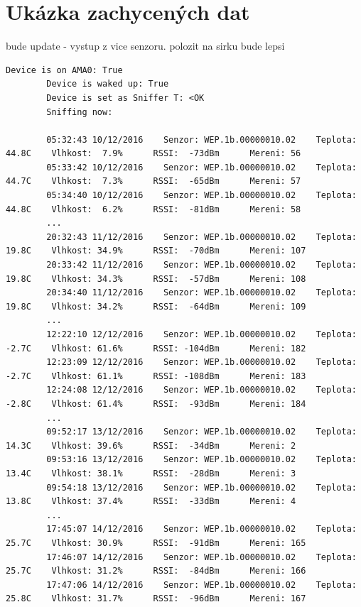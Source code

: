 \chapter{Ukázka zachycených dat}
\label{PrilohaVystup}
	\colorbox[rgb]{1,0,0}{bude update - vystup z vice senzoru. polozit na sirku bude lepsi}
	\begin{lstlisting}[style=MyCodeBash]
		Device is on AMA0: True
		Device is waked up: True
		Device is set as Sniffer T: <OK
		Sniffing now:

		05:32:43 10/12/2016    Senzor: WEP.1b.00000010.02    Teplota: 44.8C    Vlhkost:  7.9%      RSSI:  -73dBm      Mereni: 56
		05:33:42 10/12/2016    Senzor: WEP.1b.00000010.02    Teplota: 44.7C    Vlhkost:  7.3%      RSSI:  -65dBm      Mereni: 57
		05:34:40 10/12/2016    Senzor: WEP.1b.00000010.02    Teplota: 44.8C    Vlhkost:  6.2%      RSSI:  -81dBm      Mereni: 58
		...
		20:32:43 11/12/2016    Senzor: WEP.1b.00000010.02    Teplota: 19.8C    Vlhkost: 34.9%      RSSI:  -70dBm      Mereni: 107
		20:33:42 11/12/2016    Senzor: WEP.1b.00000010.02    Teplota: 19.8C    Vlhkost: 34.3%      RSSI:  -57dBm      Mereni: 108
		20:34:40 11/12/2016    Senzor: WEP.1b.00000010.02    Teplota: 19.8C    Vlhkost: 34.2%      RSSI:  -64dBm      Mereni: 109
		...
		12:22:10 12/12/2016    Senzor: WEP.1b.00000010.02    Teplota: -2.7C    Vlhkost: 61.6%      RSSI: -104dBm      Mereni: 182
		12:23:09 12/12/2016    Senzor: WEP.1b.00000010.02    Teplota: -2.7C    Vlhkost: 61.1%      RSSI: -108dBm      Mereni: 183 
		12:24:08 12/12/2016    Senzor: WEP.1b.00000010.02    Teplota: -2.8C    Vlhkost: 61.4%      RSSI:  -93dBm      Mereni: 184
		...
		09:52:17 13/12/2016    Senzor: WEP.1b.00000010.02    Teplota: 14.3C    Vlhkost: 39.6%      RSSI:  -34dBm      Mereni: 2
		09:53:16 13/12/2016    Senzor: WEP.1b.00000010.02    Teplota: 13.4C    Vlhkost: 38.1%      RSSI:  -28dBm      Mereni: 3 
		09:54:18 13/12/2016    Senzor: WEP.1b.00000010.02    Teplota: 13.8C    Vlhkost: 37.4%      RSSI:  -33dBm      Mereni: 4
		...
		17:45:07 14/12/2016    Senzor: WEP.1b.00000010.02    Teplota: 25.7C    Vlhkost: 30.9%      RSSI:  -91dBm      Mereni: 165
		17:46:07 14/12/2016    Senzor: WEP.1b.00000010.02    Teplota: 25.7C    Vlhkost: 31.2%      RSSI:  -84dBm      Mereni: 166
		17:47:06 14/12/2016    Senzor: WEP.1b.00000010.02    Teplota: 25.8C    Vlhkost: 31.7%      RSSI:  -96dBm      Mereni: 167

	\end{lstlisting}
	
